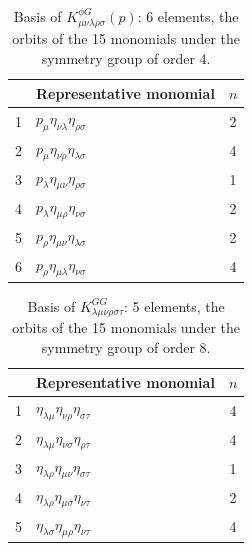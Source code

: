 \documentclass[prd,aps,preprint,nofootinbib,amsmath,amssymb,eqsecnum]{revtex4-2}
\begin{document}
\begin{table}[htb]
\centering
\begin{tabular}{@{}cl c@{}}
\toprule
& Representative monomial & $n$ \\
\midrule
1 & $p_{\mu}\eta_{\nu\lambda}\eta_{\rho\sigma}$ & 2 \\
2 & $p_{\mu}\eta_{\nu\rho}\eta_{\lambda\sigma}$ & 4 \\
3 & $p_{\lambda}\eta_{\mu\nu}\eta_{\rho\sigma}$ & 1 \\
4 & $p_{\lambda}\eta_{\mu\rho}\eta_{\nu\sigma}$ & 2 \\
5 & $p_{\rho}\eta_{\mu\nu}\eta_{\lambda\sigma}$ & 2 \\
6 & $p_{\rho}\eta_{\mu\lambda}\eta_{\nu\sigma}$ & 4 \\
\bottomrule
\end{tabular}
\caption{Basis of $K^{\phi G}_{\mu\nu\lambda\rho\sigma}(p)$: 6 elements, the orbits of the 15
monomials under the symmetry group of order 4.}
\label{tab:basis-phiG}
\end{table}

\begin{table}[htb]
\centering
\begin{tabular}{@{}cl c@{}}
\toprule
& Representative monomial & $n$ \\
\midrule
1 & $\eta_{\lambda\mu}\eta_{\nu\rho}\eta_{\sigma\tau}$ & 4 \\
2 & $\eta_{\lambda\mu}\eta_{\nu\sigma}\eta_{\rho\tau}$ & 4 \\
3 & $\eta_{\lambda\rho}\eta_{\mu\nu}\eta_{\sigma\tau}$ & 1 \\
4 & $\eta_{\lambda\rho}\eta_{\mu\sigma}\eta_{\nu\tau}$ & 2 \\
5 & $\eta_{\lambda\sigma}\eta_{\mu\rho}\eta_{\nu\tau}$ & 4 \\
\bottomrule
\end{tabular}
\caption{Basis of $K^{GG}_{\lambda\mu\nu\rho\sigma\tau}$: 5 elements, the orbits of the 15
monomials under the symmetry group of order 8.}
\label{tab:basis-GG}
\end{table}
\end{document}
